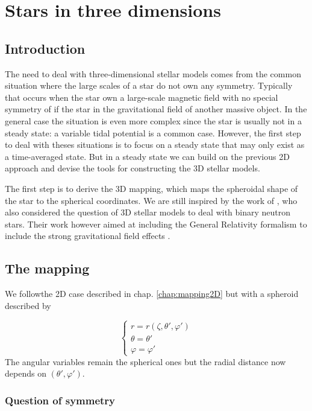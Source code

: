 \chapter{Stars in three dimensions}
\label{chap:3D}


\section{Introduction}

The need to deal with three-dimensional stellar models comes from the common
situation where the large scales of a star do not own any symmetry. Typically
that occurs when the star own a large-scale magnetic field with no special
symmetry of if the star  in the gravitational field of another massive object.
In the general case the situation is even more complex since the star is
usually not in a steady state: a variable tidal potential is a common case.
However, the first step to deal with theses situations is to focus on a steady
state that may only exist as a time-averaged state. But in a steady state we can
build on the previous 2D approach and devise the tools for constructing the 3D
stellar models.

The first step is to derive the 3D mapping, which maps the spheroidal shape of
the star to the spherical coordinates. We are still inspired by the work of
\cite{BGM98}, who also considered the question of 3D stellar models to deal with
binary neutron stars. Their work however aimed at including the General
Relativity formalism to include the strong gravitational field effects
\citep{BGM99}.

\section{The mapping}

We followthe 2D case described in chap. \ref{chap:mapping2D} but with a spheroid
described by

\begin{equation}
\left\{
\begin{array}{l}
r=r(\zeta,\theta',\varphi')\\
\theta=\theta'\\
\varphi=\varphi'
\end{array}
\right.
\label{themap3D}
\end{equation}
The angular variables remain the spherical ones but the radial distance now
depends on $(\theta',\varphi')$.

\subsection{Question of symmetry}

